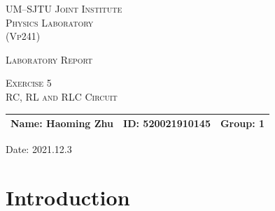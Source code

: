 \documentclass{article}
\begin{document}
\vspace*{0.4cm}

\hrulefill %

\thispagestyle{empty} %

\begin{center}
\begin{large}
\scshape{UM--SJTU Joint Institute \vspace{0.3em} \\ Physics Laboratory \\(Vp241)}
\end{large}

\hrulefill %

\vspace*{7.5cm}
\begin{Large}
\scshape{{Laboratory Report}}
\end{Large}

\vspace{2.5em}

\begin{large}
\scshape{Exercise 5}\\
\vspace{0.5em}
\scshape{RC, RL and RLC Circuit}
\end{large}
\end{center}

\vspace{13em}

\begin{table}[h!]
\center
\begin{tabular}{lll}
\textbf{Name: Haoming  Zhu} \hspace*{2em}&
\textbf{ID: 520021910145}\hspace*{2em}
& Group: 1 \\ \bottomrule
\end{tabular}
\end{table}

\vspace{-0.4cm}

\begin{center}
\hspace{0.3em} Date: 2021.12.3
\end{center}

\newpage
\tableofcontents
\setcounter{page}{0}
\thispagestyle{empty}
\newpage



		\section{Introduction}
\end{document}
